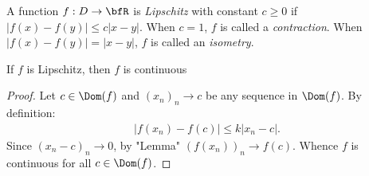    \begin{definition}
        A function $f:D \rightarrow \bfR$ is \textit{Lipschitz} with constant $c \geq 0$ if $|f(x) - f(y)| \leq c|x-y|$. When $c = 1$, $f$ is called a \textit{contraction}. When $|f(x)-f(y)| = |x-y|$, $f$ is called an \textit{isometry}.
    \end{definition}

    \begin{proposition}
        If $f$ is Lipschitz, then $f$ is continuous 
    \end{proposition}
        \begin{proof}
            Let $c \in \Dom(f)$ and $(x_n)_n \rightarrow c$ be any sequence in $\Dom(f)$. By definition:
                \begin{equation*}
                \begin{split}
                    |f(x_n)-f(c)| \leq k|x_n - c|.
                \end{split}
                \end{equation*}
            Since $(x_n - c)_n \rightarrow 0$, by "Lemma" $(f(x_n))_n \rightarrow f(c)$. Whence $f$ is continuous for all $c \in \Dom(f)$.
        \end{proof}

